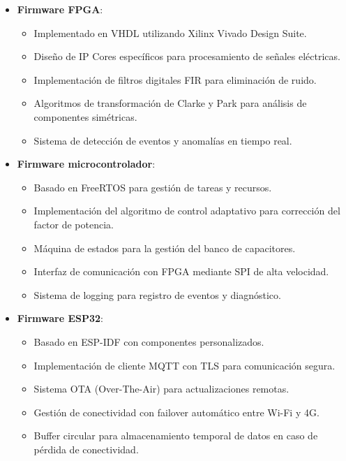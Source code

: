 \documentclass{report}          %
\begin{document}
                \begin{itemize}
                    \item \textbf{Firmware FPGA}:
                    \begin{itemize}
                        \item Implementado en VHDL utilizando Xilinx Vivado Design Suite.
                        \item Diseño de IP Cores específicos para procesamiento de señales eléctricas.
                        \item Implementación de filtros digitales FIR para eliminación de ruido.
                        \item Algoritmos de transformación de Clarke y Park para análisis de componentes simétricas.
                        \item Sistema de detección de eventos y anomalías en tiempo real.
                    \end{itemize}
                    
                    \item \textbf{Firmware microcontrolador}:
                    \begin{itemize}
                        \item Basado en FreeRTOS para gestión de tareas y recursos.
                        \item Implementación del algoritmo de control adaptativo para corrección del factor de potencia.
                        \item Máquina de estados para la gestión del banco de capacitores.
                        \item Interfaz de comunicación con FPGA mediante SPI de alta velocidad.
                        \item Sistema de logging para registro de eventos y diagnóstico.
                    \end{itemize}
                    
                    \item \textbf{Firmware ESP32}:
                    \begin{itemize}
                        \item Basado en ESP-IDF con componentes personalizados.
                        \item Implementación de cliente MQTT con TLS para comunicación segura.
                        \item Sistema OTA (Over-The-Air) para actualizaciones remotas.
                        \item Gestión de conectividad con failover automático entre Wi-Fi y 4G.
                        \item Buffer circular para almacenamiento temporal de datos en caso de pérdida de conectividad.
                    \end{itemize}
                \end{itemize}
            
\end{document}
